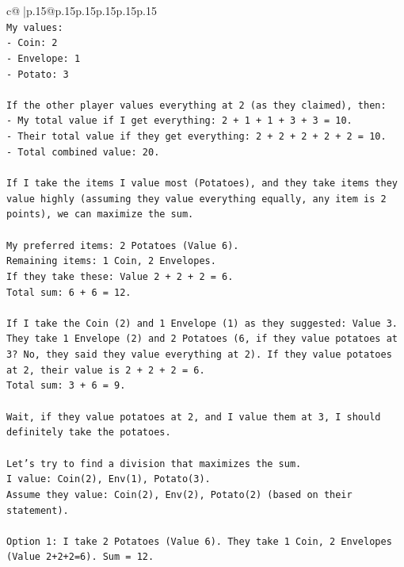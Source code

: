 \documentclass{article}
\begin{document}
{\begin{supertabular}{c@{$\;$}|p{.15\linewidth}@{}p{.15\linewidth}p{.15\linewidth}p{.15\linewidth}p{.15\linewidth}p{.15\linewidth}}
{{{\\ 
\texttt{My values:} \\
\texttt{{-} Coin: 2} \\
\texttt{{-} Envelope: 1} \\
\texttt{{-} Potato: 3} \\
\\ 
\texttt{If the other player values everything at 2 (as they claimed), then:} \\
\texttt{{-} My total value if I get everything: 2 + 1 + 1 + 3 + 3 = 10.} \\
\texttt{{-} Their total value if they get everything: 2 + 2 + 2 + 2 + 2 = 10.} \\
\texttt{{-} Total combined value: 20.} \\
\\ 
\texttt{If I take the items I value most (Potatoes), and they take items they value highly (assuming they value everything equally, any item is 2 points), we can maximize the sum.} \\
\\ 
\texttt{My preferred items: 2 Potatoes (Value 6).} \\
\texttt{Remaining items: 1 Coin, 2 Envelopes.} \\
\texttt{If they take these: Value 2 + 2 + 2 = 6.} \\
\texttt{Total sum: 6 + 6 = 12.} \\
\\ 
\texttt{If I take the Coin (2) and 1 Envelope (1) as they suggested: Value 3.} \\
\texttt{They take 1 Envelope (2) and 2 Potatoes (6, if they value potatoes at 3? No, they said they value everything at 2). If they value potatoes at 2, their value is 2 + 2 + 2 = 6.} \\
\texttt{Total sum: 3 + 6 = 9.} \\
\\ 
\texttt{Wait, if they value potatoes at 2, and I value them at 3, I should definitely take the potatoes.} \\
\\ 
\texttt{Let's try to find a division that maximizes the sum.} \\
\texttt{I value: Coin(2), Env(1), Potato(3).} \\
\texttt{Assume they value: Coin(2), Env(2), Potato(2) (based on their statement).} \\
\\ 
\texttt{Option 1: I take 2 Potatoes (Value 6). They take 1 Coin, 2 Envelopes (Value 2+2+2=6). Sum = 12.} \\
}}}
\end{supertabular}}
\end{document}
